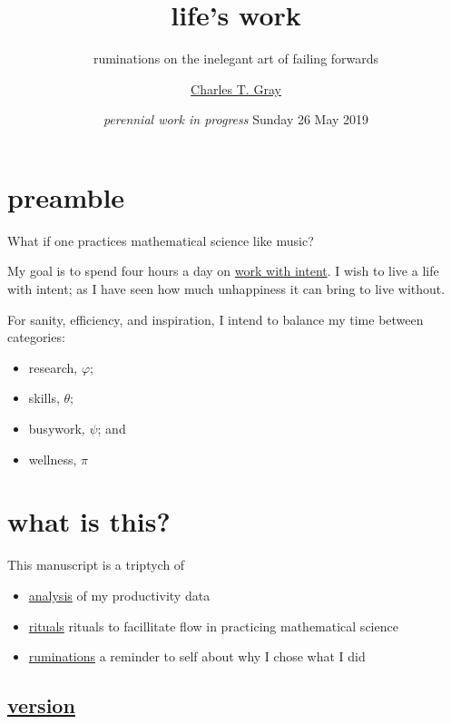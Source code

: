 \documentclass[]{book}
\title{life's work}
\subtitle{ruminations on the inelegant art of failing forwards}
\author{\href{http://cantabile.rbind.io/about.html}{Charles T. Gray}}
\date{\emph{perennial work in progress} Sunday 26 May 2019}
\providecommand{\tightlist}{%
  \setlength{\itemsep}{0pt}\setlength{\parskip}{0pt}}
\begin{document}
\maketitle

{
\setcounter{tocdepth}{1}
\tableofcontents
}
\hypertarget{preamble}{%
\chapter{preamble}\label{preamble}}

What if one practices mathematical science like music?

My goal is to spend four hours a day on \protect\hyperlink{work-with-intent}{work with intent}. I wish to live a life with intent; as I have seen how much unhappiness it can bring to live without.

For sanity, efficiency, and inspiration, I intend to balance my time between categories:

\begin{itemize}
\tightlist
\item
  research, \(\varphi\);
\item
  skills, \(\theta\);\\
\item
  busywork, \(\psi\); and
\item
  wellness, \(\pi\)
\end{itemize}

\hypertarget{what-is-this}{%
\chapter{what is this?}\label{what-is-this}}

This manuscript is a triptych of

\begin{itemize}
\tightlist
\item
  \protect\hyperlink{analysis}{analysis} of my productivity data
\item
  \protect\hyperlink{rituals}{rituals} rituals to facillitate flow in practicing mathematical science
\item
  \protect\hyperlink{ruminations}{ruminations} a reminder to self about why I chose what I did
\end{itemize}

\hypertarget{version}{%
\section{\texorpdfstring{\protect\hyperlink{mindfulness}{version}}{version}}\label{version}}
\end{document}
